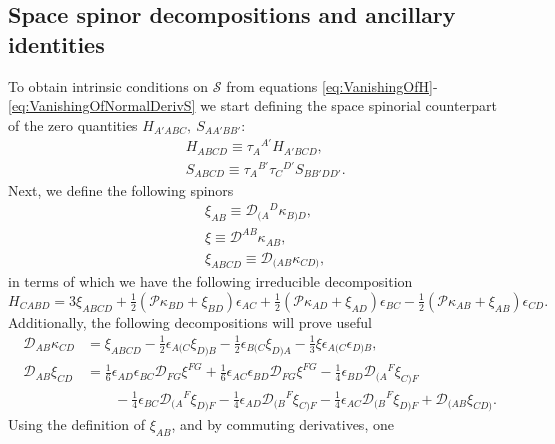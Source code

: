 \documentclass[10pt,a4paper]{article}
\theoremstyle{plain}
\begin{document}
\subsection{Space spinor decompositions and ancillary identities}
To obtain intrinsic conditions on $\mathcal{S}$ from equations
\eqref{eq:VanishingOfH}-\eqref{eq:VanishingOfNormalDerivS} we start
defining the space spinorial counterpart of the zero quantities
$H_{A'ABC},~S_{AA'BB'}$:
\begin{subequations}
\begin{align} 
 & H_{ABCD} \equiv \tau_{A}{}^{A'}
  H_{A'BCD},\label{DefSpaceSpinorH}\\ & S_{ABCD} \equiv
  \tau_{A}{}^{B'} \tau_{C}{}^{D'} S_{BB'DD'}. \label{DefSpaceSpinorS}
\end{align}
\end{subequations}
 Next, we define the following spinors
 \begin{align*}
& \xi_{AB} \equiv \mathcal{D}_{(A}{}^{D}\kappa_{B)D},\\ & \xi \equiv
   \mathcal{D}^{AB}\kappa_{AB},\\ & \xi_{ABCD} \equiv
   \mathcal{D}_{(AB}\kappa_{CD)},
 \end{align*}
in terms of which we have the following irreducible decomposition
\[H_{CABD} = 3 \xi_{ABCD} + \tfrac{1}{2} \left(\mathcal{P}\kappa_{BD} 
+ \xi_{BD}\right) \epsilon_{AC} + \tfrac{1}{2}\left(
\mathcal{P}\kappa_{AD} + \xi_{AD}\right) \epsilon_{BC} - \tfrac{1}{2}
\left(\mathcal{P}\kappa_{AB}+ \xi_{AB}\right) \epsilon_{CD}.\]
 Additionally, the following
 decompositions will prove useful
\begin{align}
\mathcal{D}_{AB}\kappa_{CD} &= \xi_{ABCD} - \tfrac{1}{2}
\epsilon_{A(C}\xi_{D)B} - \tfrac{1}{2} \epsilon_{B(C}\xi_{D)A} -
\tfrac{1}{3} \xi \epsilon_{A(C}
\epsilon_{D)B}, \label{GradSenDCDeKillingSpinor}
\\ \mathcal{D}_{AB}\xi_{CD} &=\tfrac{1}{6} \epsilon_{AD} \epsilon_{BC}
\mathcal{D}_{FG}\xi^{FG} + \tfrac{1}{6} \epsilon_{AC} \epsilon_{BD}
\mathcal{D}_{FG}\xi^{FG} - \tfrac{1}{4} \epsilon_{BD}
\mathcal{D}_{(A}{}^{F}\xi_{C)F} \nonumber \\ &\qquad - \tfrac{1}{4}
\epsilon_{BC} \mathcal{D}_{(A}{}^{F}\xi_{D)F} - \tfrac{1}{4}
\epsilon_{AD} \mathcal{D}_{(B}{}^{F}\xi_{C)F} - \tfrac{1}{4}
\epsilon_{AC} \mathcal{D}_{(B}{}^{F}\xi_{D)F} +
\mathcal{D}_{(AB}\xi_{CD)}. \label{GradSenDCDeSpaceSpinorAuxiliaryVector}
\end{align}
Using the definition of $\xi_{AB}$, and by commuting derivatives, one
\end{document}
